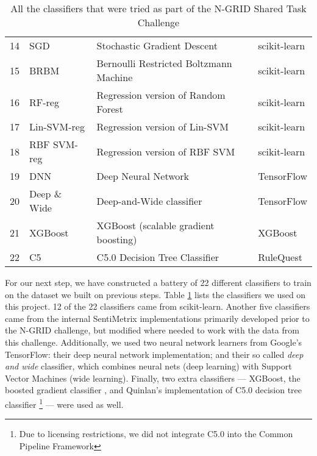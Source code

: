 \begin{table}[t]
{\begin{tabular}{|l|l|l|l|}
    14 & \textsf{SGD} & \textsf{Stochastic Gradient Descent \cite{scikit-learn}}& \textsf{scikit-learn} \\
    15 & \textsf{BRBM} & \textsf{Bernoulli Restricted Boltzmann Machine \cite{scikit-learn}} & \textsf{scikit-learn}\\
    16 & \textsf{RF-reg} & \textsf{Regression version of Random Forest \cite{ho95}}& \textsf{scikit-learn}\\
    17 & \textsf{Lin-SVM-reg} & \textsf{Regression version of Lin-SVM \cite{cortes95}}& \textsf{scikit-learn}\\
    18 & \textsf{RBF SVM-reg} & \textsf{Regression version of RBF SVM \cite{cortes95}}& \textsf{scikit-learn}\\
    \hline
    19 & \textsf{DNN} & \textsf{Deep Neural Network \cite{tensorflow}}& \textsf{TensorFlow} \\
    20 & \textsf{Deep \& Wide} & \textsf{Deep-and-Wide classifier \cite{tensorflow}}& \textsf{TensorFlow} \\
    \hline
    21 & \textsf{XGBoost}& \textsf{XGBoost (scalable gradient boosting) \cite{xgboost}}& \textsf{XGBoost} \\
    22 & \textsf{C5} & \textsf{C5.0 Decision Tree Classifier \cite{c5}} & \textsf{RuleQuest} \\
    \hline
    \end{tabular}
    \caption{All the classifiers that were tried as part of the N-GRID Shared Task Challenge}
    \label{tab:Classifiers}
}
\end{table}


For our next step, we have constructed a battery of 22 different classifiers
to train on the dataset we built on previous steps. 
Table \ref{tab:Classifiers} lists the classifiers we
used on this project. 12 of the 22 classifiers came from \textsf{scikit-learn}.
Another five classifiers came from the internal SentiMetrix implementations
primarily developed prior to the N-GRID challenge, but modified where needed
to work with the data from this challenge.  Additionally, we used two 
neural network learners from Google's \textsf{TensorFlow}: their deep neural network
implementation; and their so called \textit{deep and wide} classifier, which
combines neural nets (deep learning) with Support Vector Machines (wide learning).
Finally, two extra classifiers --- \textsf{XGBoost}, the boosted gradient classifier
\cite{xgboost}, and Quinlan's implementation of
C5.0 decision tree classifier \footnote{Due to licensing restrictions, we did not integrate C5.0 into the Common Pipeline Framework} \cite{c5} --- were used as well.

